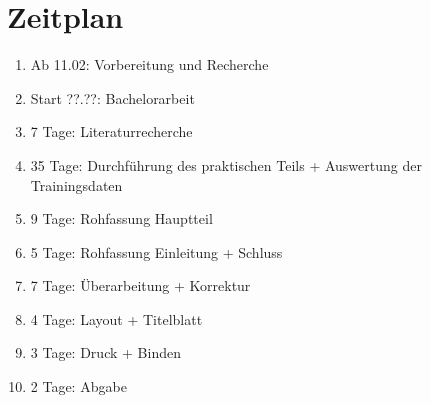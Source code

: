 \documentclass[a4paper,12pt,oneside]{article}
\begin{document}
  
  \section{Zeitplan}  
  
  \begin{enumerate}
  \item Ab 11.02:     	Vorbereitung und Recherche
  \item Start ??.??: 	Bachelorarbeit
  \item 7 Tage: 		Literaturrecherche
  \item 35 Tage: 		Durchführung des praktischen Teils + Auswertung der Trainingsdaten
  \item 9 Tage:		Rohfassung Hauptteil
  \item 5 Tage:		Rohfassung Einleitung + Schluss
  \item 7 Tage:		Überarbeitung + Korrektur
  \item 4 Tage:		Layout + Titelblatt
  \item 3 Tage:		Druck + Binden
  \item 2 Tage:		Abgabe
  \end{enumerate}
  
  \newpage
  
  \printbibliography
  
\end{document}
